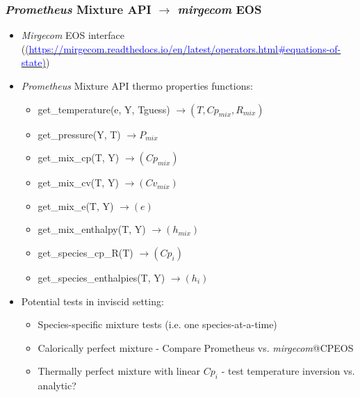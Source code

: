 \begin{frame}\frametitle{\textit{Prometheus} Mixture API $\rightarrow$ \textit{mirgecom} EOS}
\begin{multicols}{2}
\begin{itemize}
   \item \textit{Mirgecom} EOS interface (\href{https://mirgecom.readthedocs.io/en/latest/operators.html#equations-of-state}{(\textcolor{blue}{https://mirgecom.readthedocs.io/en/latest/operators.html#equations-of-state})})
   \item \textit{Prometheus} Mixture API thermo properties functions:
   \begin{itemize}
      \item get\_temperature(e, Y, Tguess) $\rightarrow (T, Cp_{mix}, R_{mix})$
      \item get\_pressure(Y, T) $\rightarrow P_{mix}$ 
      \item get\_mix\_cp(T, Y) $\rightarrow (Cp_{mix})$ 
      \item get\_mix\_cv(T, Y) $\rightarrow (Cv_{mix})$
      \item get\_mix\_e(T, Y) $\rightarrow (e)$
      \item get\_mix\_enthalpy(T, Y) $\rightarrow (h_{mix})$
      \item get\_species\_cp\_R(T) $\rightarrow (Cp_{i})$ 
      \item get\_species\_enthalpies(T, Y) $\rightarrow (h_{i})$
   \end{itemize}
   \item Potential tests in inviscid setting:
   \begin{itemize}
     \item Species-specific mixture tests (i.e. one species-at-a-time)
     \item Calorically perfect mixture - Compare Prometheus vs. \textit{mirgecom}@CPEOS
     \item Thermally perfect mixture with linear $Cp_i$ - test temperature inversion vs. analytic? 
   \end{itemize}
\end{itemize}
\end{multicols}
\end{frame}

